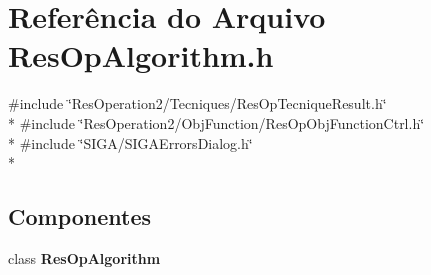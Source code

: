 \section{Referência do Arquivo Res\+Op\+Algorithm.\+h}
\label{_res_op_algorithm_8h}
{\ttfamily \#include \char`\"{}Res\+Operation2/\+Tecniques/\+Res\+Op\+Tecnique\+Result.\+h\char`\"{}}\\*
{\ttfamily \#include \char`\"{}Res\+Operation2/\+Obj\+Function/\+Res\+Op\+Obj\+Function\+Ctrl.\+h\char`\"{}}\\*
{\ttfamily \#include \char`\"{}S\+I\+G\+A/\+S\+I\+G\+A\+Errors\+Dialog.\+h\char`\"{}}\\*
\subsection*{Componentes}
\begin{DoxyCompactItemize}
\item 
class {\bf Res\+Op\+Algorithm}
\end{DoxyCompactItemize}
